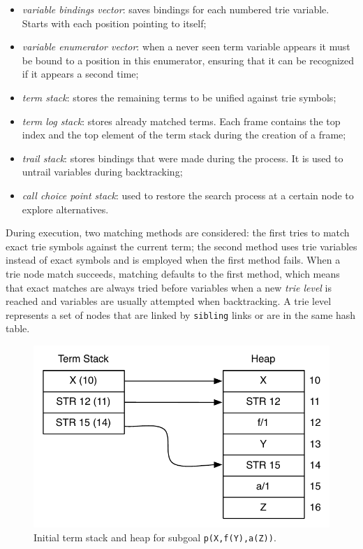 \begin{itemize}
  \item \textit{variable bindings vector}: saves bindings for each numbered trie variable. Starts with each position pointing to itself;
  \item \textit{variable enumerator vector}: when a never seen term variable appears it must be bound to a position in this enumerator, ensuring that it can be recognized if it appears a second time;
  \item \textit{term stack}: stores the remaining terms to be unified against trie symbols;
  \item \textit{term log stack}: stores already matched terms. Each frame contains the top index and the top element of the term stack during the creation of a frame;
  \item \textit{trail stack}: stores bindings that were made during the process. It is used to untrail variables during backtracking;
  \item \textit{call choice point stack}: used to restore the search process at a certain node to explore alternatives.
\end{itemize}

During execution, two matching methods are considered: the first tries to match exact trie symbols against the current term;
the second method uses trie variables instead of exact symbols and is employed when the first method fails.
When a trie node match succeeds, matching defaults to the first method, which means
that exact matches are always tried before variables when a new \textit{trie level} is reached and variables are usually attempted
when backtracking. A trie level represents a set of nodes that are linked by \texttt{sibling} links or are
in the same hash table.

\begin{figure}[ht]
  \centering
    \includegraphics[scale=0.6]{lookup_subgoal_termstack_start.pdf}
  \caption{Initial term stack and heap for subgoal \texttt{p(X,f(Y),a(Z))}.}
  \label{fig:lookup_subgoal_termstack_start}
\end{figure}

